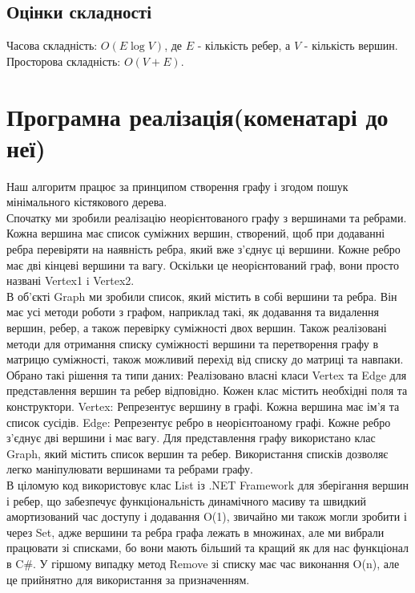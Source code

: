 \documentclass[12pt, letterpaper, twoside]{article}
\begin{document}
\subsection{Оцінки складності}
Часова складність: \(O(E\log V)\), де \(E\) - кількість ребер, а \(V\) - кількість вершин. \\
Просторова складність: \(O(V+E)\).

\section{Програмна реалізація(коменатарі до неї)}

Наш алгоритм працює за принципом створення 
графу і згодом пошук мінімального кістякового дерева.\\
Спочатку ми зробили реалізацію неорієнтованого графу з вершинами та ребрами. Кожна вершина має список суміжних вершин, створений, щоб при додаванні ребра перевіряти на наявність ребра, який вже з'єднує ці вершини. Кожне ребро має дві кінцеві вершини та вагу. Оскільки це неорієнтований граф, вони просто названі Vertex1 i Vertex2. \\

В об’єкті Graph ми зробили список, який містить в собі вершини та ребра. Він має усі методи роботи з графом, наприклад такі, як додавання та видалення вершин, ребер, а також перевірку суміжності двох вершин. Також реалізовані методи для отримання списку суміжності вершини та перетворення графу в матрицю суміжності, також можливий перехід від списку до матриці та навпаки.\\

Обрано такі рішення та типи даних:
Реалізовано власні класи Vertex та Edge для представлення вершин та ребер відповідно. Кожен клас містить необхідні поля та конструктори.
Vertex: Репрезентує вершину в графі. Кожна вершина має ім'я та список сусідів.
Edge: Репрезентує ребро в неорієнтоаному графі. Кожне ребро з'єднує дві вершини і має вагу.
Для представлення графу використано клас Graph, який містить список вершин та ребер. Використання списків дозволяє легко маніпулювати вершинами та ребрами графу.\\

В ціломую код використовує клас List із .NET Framework для зберігання вершин і ребер, що забезпечує функціональність динамічного масиву та швидкий амортизований час доступу і додавання O(1), звичайно ми також могли зробити і через Set, адже вершини та ребра графа лежать в множинах, але ми вибрали працювати зі списками, бо вони мають більший та кращий як для нас функціонал в C\#. У гіршому випадку метод Remove зі списку має час виконання O(n), але це прийнятно для використання за призначенням.\\
\end{document}
